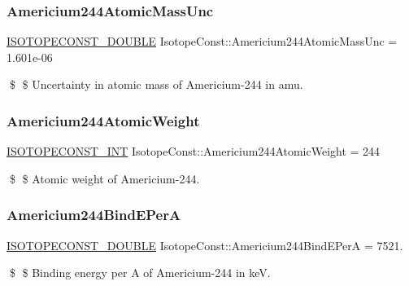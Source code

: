 \subsubsection{\texorpdfstring{Americium244\+Atomic\+Mass\+Unc}{Americium244AtomicMassUnc}}
{\footnotesize\ttfamily \mbox{\hyperlink{group___isotope_const-_macros_ga8f45a7272ce02c0b4c65c44636ed719a}{I\+S\+O\+T\+O\+P\+E\+C\+O\+N\+S\+T\+\_\+\+D\+O\+U\+B\+LE}} Isotope\+Const\+::\+Americium244\+Atomic\+Mass\+Unc = 1.\+601e-\/06}

\$ \$ Uncertainty in atomic mass of Americium-\/244 in amu. \mbox{\label{group___isotope_const-_americium-_am244_gaaa989d30e07b2144866e4c633fe78747}} 
\subsubsection{\texorpdfstring{Americium244\+Atomic\+Weight}{Americium244AtomicWeight}}
{\footnotesize\ttfamily \mbox{\hyperlink{group___isotope_const-_macros_ga5f18360b3e99483a35c32d789e62621c}{I\+S\+O\+T\+O\+P\+E\+C\+O\+N\+S\+T\+\_\+\+I\+NT}} Isotope\+Const\+::\+Americium244\+Atomic\+Weight = 244}

\$ \$ Atomic weight of Americium-\/244. \mbox{\label{group___isotope_const-_americium-_am244_gaa6688cb965c19f7f3af92a0218560fd8}} 
\subsubsection{\texorpdfstring{Americium244\+Bind\+E\+PerA}{Americium244BindEPerA}}
{\footnotesize\ttfamily \mbox{\hyperlink{group___isotope_const-_macros_ga8f45a7272ce02c0b4c65c44636ed719a}{I\+S\+O\+T\+O\+P\+E\+C\+O\+N\+S\+T\+\_\+\+D\+O\+U\+B\+LE}} Isotope\+Const\+::\+Americium244\+Bind\+E\+PerA = 7521.}

\$ \$ Binding energy per A of Americium-\/244 in keV. \mbox{\label{group___isotope_const-_americium-_am244_ga59b1a25937981a164da11b4b2f396b95}} 
